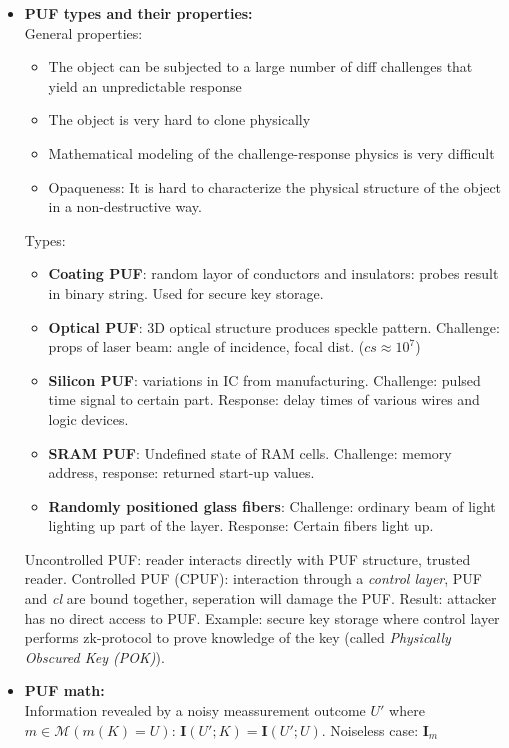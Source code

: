 \documentclass[twocolumn,9pt]{extarticle}
\begin{document}
\begin{itemize}
	\item \textbf{PUF types and their properties: } \\
	General properties:
	\begin{itemize}
		\item The object can be subjected to a large number of diff challenges that yield an unpredictable response
		\item The object is very hard to clone physically
		\item Mathematical modeling of the challenge-response physics is very difficult
		\item Opaqueness: It is hard to characterize the physical structure of the object in a non-destructive way.
	\end{itemize}
	Types:
	\begin{itemize}
		\item \textbf{Coating PUF}: random layor of conductors and insulators: probes result in binary string. Used for secure key storage.
		\item \textbf{Optical PUF}: 3D optical structure produces speckle pattern. Challenge: props of laser beam: angle of incidence, focal dist. ($cs \approx 10^7$)
		\item \textbf{Silicon PUF}: variations in IC from manufacturing. Challenge: pulsed time signal to certain part. Response: delay times of various wires and logic devices.
		\item \textbf{SRAM PUF}: Undefined state of RAM cells. Challenge: memory address, response: returned start-up values.
		\item \textbf{Randomly positioned glass fibers}: Challenge: ordinary beam of light lighting up part of the layer. Response: Certain fibers light up.
	\end{itemize}
	Uncontrolled PUF: reader interacts directly with PUF structure, trusted reader. Controlled PUF (CPUF): interaction through a \emph{control layer}, PUF and \emph{cl} are bound together, seperation will damage the PUF. Result: attacker has no direct access to PUF. Example: secure key storage where control layer performs zk-protocol to prove knowledge of the key (called \emph{Physically Obscured Key (POK)}).

	\item \textbf{PUF math:} \\
	Information revealed by a noisy meassurement outcome $U'$ where $m \in \mathcal{M} (m(K) = U)$: $\mathbf{I}(U';K) = \mathbf{I}(U';U)$. Noiseless case: $\mathbf{I}_m$\\


\end{itemize}
\end{document}
